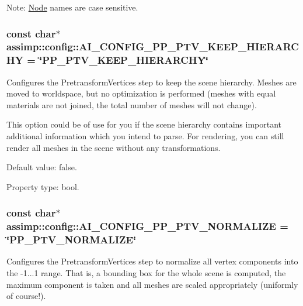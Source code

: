Note\+: \hyperlink{struct_node}{Node} names are case sensitive. \hypertarget{namespaceassimp_1_1config_a8abbe2214c1a1f577f5fef5c83564e0f}{
\subsubsection[{A\+I\+\_\+\+C\+O\+N\+F\+I\+G\+\_\+\+P\+P\+\_\+\+P\+T\+V\+\_\+\+K\+E\+E\+P\+\_\+\+H\+I\+E\+R\+A\+R\+C\+H\+Y}]{\setlength{\rightskip}{0pt plus 5cm}const char$\ast$ assimp\+::config\+::\+A\+I\+\_\+\+C\+O\+N\+F\+I\+G\+\_\+\+P\+P\+\_\+\+P\+T\+V\+\_\+\+K\+E\+E\+P\+\_\+\+H\+I\+E\+R\+A\+R\+C\+H\+Y = \char`\"{}P\+P\+\_\+\+P\+T\+V\+\_\+\+K\+E\+E\+P\+\_\+\+H\+I\+E\+R\+A\+R\+C\+H\+Y\char`\"{}}}\label{namespaceassimp_1_1config_a8abbe2214c1a1f577f5fef5c83564e0f}
Configures the {\ttfamily Pretransform\+Vertices} step to keep the scene hierarchy. Meshes are moved to worldspace, but no optimization is performed (meshes with equal materials are not joined, the total number of meshes will not change).

This option could be of use for you if the scene hierarchy contains important additional information which you intend to parse. For rendering, you can still render all meshes in the scene without any transformations.

Default value\+: false.

Property type\+: bool. \hypertarget{namespaceassimp_1_1config_ac56a80847aeed84e6a83971db5694a66}{
\subsubsection[{A\+I\+\_\+\+C\+O\+N\+F\+I\+G\+\_\+\+P\+P\+\_\+\+P\+T\+V\+\_\+\+N\+O\+R\+M\+A\+L\+I\+Z\+E}]{\setlength{\rightskip}{0pt plus 5cm}const char$\ast$ assimp\+::config\+::\+A\+I\+\_\+\+C\+O\+N\+F\+I\+G\+\_\+\+P\+P\+\_\+\+P\+T\+V\+\_\+\+N\+O\+R\+M\+A\+L\+I\+Z\+E = \char`\"{}P\+P\+\_\+\+P\+T\+V\+\_\+\+N\+O\+R\+M\+A\+L\+I\+Z\+E\char`\"{}}}\label{namespaceassimp_1_1config_ac56a80847aeed84e6a83971db5694a66}
Configures the {\ttfamily Pretransform\+Vertices} step to normalize all vertex components into the -\/1...1 range. That is, a bounding box for the whole scene is computed, the maximum component is taken and all meshes are scaled appropriately (uniformly of course!).


